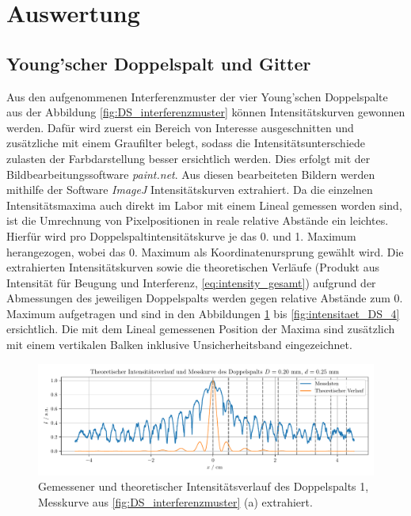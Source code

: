 \documentclass[ngerman]{scrartcl}
\begin{document}
\section{Auswertung}
\label{sec:auswertung}

\subsection{Young'scher Doppelspalt und Gitter}
\label{subsec:auswertung_doppelspalt_gitter_gitter}

Aus den aufgenommenen Interferenzmuster der vier Young'schen Doppelspalte aus der Abbildung \ref{fig:DS_interferenzmuster} können Intensitätskurven gewonnen werden. Dafür wird zuerst ein Bereich von Interesse ausgeschnitten und zusätzliche mit einem Graufilter belegt, sodass die Intensitätsunterschiede zulasten der Farbdarstellung besser ersichtlich werden. Dies erfolgt mit der Bildbearbeitungssoftware \textit{paint.net}. Aus diesen bearbeiteten Bildern werden mithilfe der Software \textit{ImageJ} Intensitätskurven extrahiert. Da die einzelnen Intensitätsmaxima auch direkt im Labor mit einem Lineal gemessen worden sind, ist die Umrechnung von Pixelpositionen in reale relative Abstände ein leichtes. Hierfür wird pro Doppelspaltintensitätskurve je das 0. und 1. Maximum herangezogen, wobei das 0. Maximum als Koordinatenursprung gewählt wird. Die extrahierten Intensitätskurven sowie die theoretischen Verläufe (Produkt aus Intensität für Beugung und Interferenz, \autoref{eq:intensity_gesamt}) aufgrund der Abmessungen des jeweiligen Doppelspalts werden gegen relative Abstände zum 0. Maximum aufgetragen und sind in den Abbildungen \ref{fig:intensitaet_DS_1} bis \ref{fig:intensitaet_DS_4} ersichtlich. Die mit dem Lineal gemessenen Position der Maxima sind zusätzlich mit einem vertikalen Balken inklusive Unsicherheitsband eingezeichnet.
%
\begin{figure}[H]
    \centering
    \begin{samepage}
        \includegraphics[width=\linewidth]{../python/plots/young_1.pdf}
        \caption[Intensitätskurve DS 1]{Gemessener und theoretischer Intensitätsverlauf des Doppelspalts 1, Messkurve aus \autoref{fig:DS_interferenzmuster} (a) extrahiert.}
        \label{fig:intensitaet_DS_1}
    \end{samepage}
\end{figure}
\end{document}
